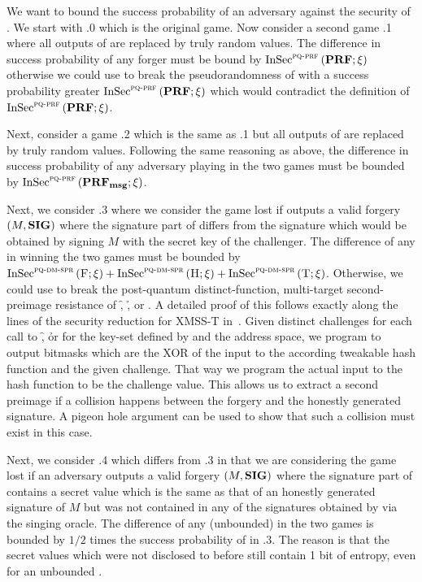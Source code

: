 We want to bound the success probability of an adversary \A against the
\pqeucma security of \spx.
We start with \game.0 which is the original \pqeucma game. Now consider a second
game \game.1 where all outputs of \sphincsPRF are replaced by truly random
values. The difference in success probability of any forger \A must be bound by
${\mathrm{InSec}}^{{\mathsf{\textsc{pq-prf}}}}\left( {\mathbf{PRF}}; {\xi} \right) $ otherwise we could use \A to break the
pseudorandomness of \sphincsPRF with a success probability greater
${\mathrm{InSec}}^{{\mathsf{\textsc{pq-prf}}}}\left( {\mathbf{PRF}}; {\xi} \right) $ which would contradict the definition of
${\mathrm{InSec}}^{{\mathsf{\textsc{pq-prf}}}}\left( {\mathbf{PRF}}; {\xi} \right) $.

Next, consider a game \game.2 which is
the same as \game.1 but all outputs of \sphincsPRFmsg are replaced by truly
random values. Following the same reasoning as above, the difference in
success probability of any adversary \A playing in the two games must be bounded
by ${\mathrm{InSec}}^{{\mathsf{\textsc{pq-prf}}}}\left( {\mathbf{PRF_{msg}}}; {\xi} \right) $.

Next, we consider \game.3 where we consider the game lost if \A outputs a valid
forgery $(M,\mathbf{SIG})$ where the \fors signature part of \spxsig differs from the
signature which would be obtained by signing $M$ with the secret key of the
challenger. The difference of any \A in winning the two games must be bounded
by ${\mathrm{InSec}}^{{\mathsf{\textsc{pq-dm-spr}}}}\left( {\textsc{F}}; {\xi} \right) + {\mathrm{InSec}}^{{\mathsf{\textsc{pq-dm-spr}}}}\left( {\textsc{H}}; {\xi} \right) + {\mathrm{InSec}}^{{\mathsf{\textsc{pq-dm-spr}}}}\left( {\textsc{T}}; {\xi} \right) $.
Otherwise, we could use \A to break the post-quantum distinct-function,
multi-target second-preimage resistance of \f, \h, or \tfunc. A detailed proof
of this follows exactly along the lines of the security reduction for XMSS-T
in~\cite{Huelsing2016}. Given distinct challenges for each call to \f, \h or
\tfunc for the key-set defined by \pseed and the address space, we program
\prfbm to output bitmasks which are the XOR of the input to the according
tweakable hash function and the given challenge. That way we program the actual
input to the hash function to be the challenge value. This allows us to extract
a second preimage if a collision happens between the forgery and the honestly
generated signature. A pigeon hole argument can be used to show that such a
collision must exist in this case.

Next, we consider \game.4 which differs from \game.3 in that we are considering
the game lost if an adversary outputs a valid
forgery $(M,\mathbf{SIG})$ where the \fors signature part of \spxsig contains a
secret value which is the same as that of an honestly generated signature of $M$
but was not contained in any of the signatures obtained by \A via the singing
oracle. The difference of any (unbounded) \A in the two games is bounded by
$1/2$ times the success probability of \A in \game.3. The reason is that
the secret values which were not disclosed to \A before still contain 1 bit of
entropy, even for an unbounded \A.

